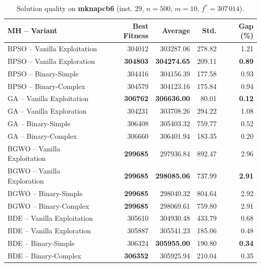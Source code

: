 \begin{table}[htbp]
  \centering
  \small
  \caption{Solution quality on \textbf{mknapcb6} (inst. 29, $n=500$, $m=10$, $f^*=307\,014$).}
  \label{tab:calidad_mknapcb6_29}
  \begin{tabular}{lrrrr}
    \toprule
    \textbf{MH -- Variant} &
    \textbf{Best Fitness} &
    \textbf{Average} &
    \textbf{Std.} &
    \textbf{Gap (\%)} \\
    \midrule
    BPSO -- Vanilla Exploitation &         304012 &        303287.06 & 278.82 &         1.21 \\
    BPSO -- Vanilla Exploration  & \textbf{304803} & \textbf{304274.65} & 209.11 & \textbf{0.89} \\
    BPSO -- Binary-Simple        &         304416 &        304156.39 & 177.58 &         0.93 \\
    BPSO -- Binary-Complex       &         304579 &        304123.16 & 175.84 &         0.94 \\
    \midrule
    GA -- Vanilla Exploitation   & \textbf{306762} & \textbf{306636.00} &  80.01 & \textbf{0.12} \\
    GA -- Vanilla Exploration    &         304231 &        303708.26 & 294.22 &         1.08 \\
    GA -- Binary-Simple          &         306408 &        305403.32 & 759.77 &         0.52 \\
    GA -- Binary-Complex         &         306660 &        306401.94 & 183.35 &         0.20 \\
    \midrule
    BGWO -- Vanilla Exploitation & \textbf{299685} &        297936.84 & 892.47 &         2.96 \\
    BGWO -- Vanilla Exploration  & \textbf{299685} & \textbf{298085.06} & 737.99 & \textbf{2.91} \\
    BGWO -- Binary-Simple        & \textbf{299685} &        298040.32 & 804.64 &         2.92 \\
    BGWO -- Binary-Complex       & \textbf{299685} &        298069.61 & 759.80 &         2.91 \\
    \midrule
    BDE -- Vanilla Exploitation  &         305610 &        304930.48 & 433.79 &         0.68 \\
    BDE -- Vanilla Exploration   &         305887 &        305541.23 & 185.06 &         0.48 \\
    BDE -- Binary-Simple         &         306324 & \textbf{305955.00} & 190.80 & \textbf{0.34} \\
    BDE -- Binary-Complex        & \textbf{306352} &        305925.94 & 210.04 &         0.35 \\
    \bottomrule
  \end{tabular}
\end{table}
